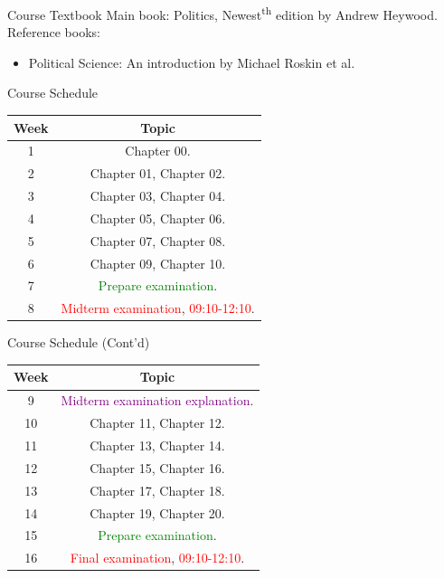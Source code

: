 \documentclass{beamer}
\begin{document}
\begin{frame}{Course Textbook}
Main book: Politics, Newest\textsuperscript{th} edition by Andrew Heywood. \\
Reference books:
\begin{itemize}
\item Political Science: An introduction by Michael Roskin et al.
\end{itemize}
\end{frame}
\begin{frame}{Course Schedule}
\begin{center}
\begin{tabular}{|c|c|}
\hline
Week & Topic \\
\hline
1 & Chapter 00.\\
\hline
2 & Chapter 01, Chapter 02.\\
\hline
3 & Chapter 03, Chapter 04.\\
\hline
4 & Chapter 05, Chapter 06.\\
\hline
5 & Chapter 07, Chapter 08.\\
\hline
6 & Chapter 09, Chapter 10.\\
\hline
7 & \textcolor{Green}{Prepare examination}.\\
\hline
8 & \textcolor{red}{Midterm examination}, \textcolor{red}{09:10-12:10}.\\
\hline
\end{tabular}
\end{center}
\end{frame}
\begin{frame}{Course Schedule (Cont'd)}
\begin{center}
\begin{tabular}{|c|c|}
\hline
Week & Topic \\
\hline
9 & \textcolor{purple}{Midterm examination explanation}.\\
\hline
10 & Chapter 11, Chapter 12.\\
\hline
11 & Chapter 13, Chapter 14.\\
\hline
12 & Chapter 15, Chapter 16.\\
\hline
13 & Chapter 17, Chapter 18.\\
\hline
14 & Chapter 19, Chapter 20.\\
\hline
15 & \textcolor{Green}{Prepare examination}.\\
\hline
16 & \textcolor{red}{Final examination}, \textcolor{red}{09:10-12:10}.\\
\hline
\end{tabular}
\end{center}
\end{frame}
\end{document}
